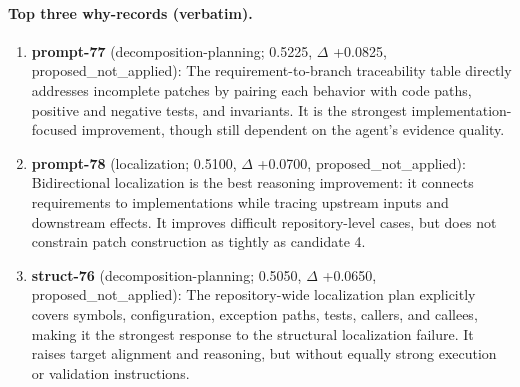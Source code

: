 \paragraph{Top three why-records (verbatim).}\begin{enumerate}\itemsep1pt
\item \textbf{prompt-77} (decomposition-planning; 0.5225, $\Delta$ +0.0825, proposed\_not\_applied): The requirement-to-branch traceability table directly addresses incomplete patches by pairing each behavior with code paths, positive and negative tests, and invariants. It is the strongest implementation-focused improvement, though still dependent on the agent's evidence quality.
\item \textbf{prompt-78} (localization; 0.5100, $\Delta$ +0.0700, proposed\_not\_applied): Bidirectional localization is the best reasoning improvement: it connects requirements to implementations while tracing upstream inputs and downstream effects. It improves difficult repository-level cases, but does not constrain patch construction as tightly as candidate 4.
\item \textbf{struct-76} (decomposition-planning; 0.5050, $\Delta$ +0.0650, proposed\_not\_applied): The repository-wide localization plan explicitly covers symbols, configuration, exception paths, tests, callers, and callees, making it the strongest response to the structural localization failure. It raises target alignment and reasoning, but without equally strong execution or validation instructions.
\end{enumerate}
